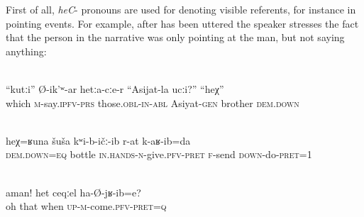 First of all, \textit{heC}- pronouns are used for denoting visible referents, for instance in pointing events. For example, after  has been uttered the speaker stresses the fact that the person in the narrative was only pointing at the man, but not saying anything:
%
\begin{exe}
	\\	\label{Who, he says to them, is Asijats brother? This one}
	\gll	``kutːi''	Ø-ik'ʷ-ar	hetːa-cːe-r	``Asijat-la	ucːi?'' 	``heχ'' \\
		which	\textsc{m}-say.\textsc{ipfv}-\textsc{prs}	those.\textsc{obl}-\textsc{in}-\textsc{abl}	Asiyat-\textsc{gen}	brother \textsc{dem.down}\\
	\glt	{}

	 \\	\label{He gave me such a bottle and sent me away}
	\gll	heχ=ʁuna	šuša	kʷi-b-ičː-ib	r-at	k-aʁ-ib=da\\
		\textsc{dem.down=eq}	bottle	\textsc{in.hands}-\textsc{n}-give.\textsc{pfv}-\textsc{pret}	\textsc{f}-send	\textsc{down}-do-\textsc{pret}=1 \\
	\glt	{}

	\\	\label{[referring to a boy that turned up unexpectedly during the conversation}
	\gll	aman!		het	ceqːel	ha-Ø-jʁ-ib=e?\\
		oh		that	when	\textsc{up}-\textsc{m}-come.\textsc{pfv}-\textsc{pret}=\textsc{q}\\
	\glt	{}
\end{exe}

